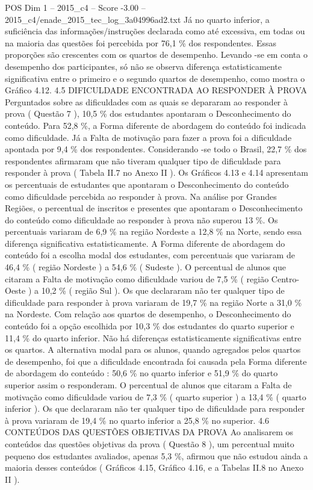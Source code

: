 \begin{textsample}{POS Dim 1 – 2015\_c4 – Score -3.00 – 2015\_c4/enade\_2015\_tec\_log\_3a04996ad2.txt}
Já no quarto inferior, a suficiência das informações/instruções declarada como até excessiva, em todas ou na maioria das questões foi percebida por 76,1 \% dos respondentes.
Essas proporções são crescentes com os quartos de desempenho.
Levando -se em conta o desempenho dos participantes, só não se observa diferença estatisticamente significativa entre o primeiro e o segundo quartos de desempenho, como mostra o Gráfico 4.12. 4.5 DIFICULDADE ENCONTRADA AO RESPONDER À PROVA Perguntados sobre as dificuldades com as quais se depararam ao responder à prova ( Questão 7 ), 10,5 \% dos estudantes apontaram o Desconhecimento do conteúdo.
Para 52,8 \%, a Forma diferente de abordagem do conteúdo foi indicada como dificuldade.
Já a Falta de motivação para fazer a prova foi a dificuldade apontada por 9,4 \% dos respondentes.
Considerando -se todo o Brasil, 22,7 \% dos respondentes afirmaram que não tiveram qualquer tipo de dificuldade para responder à prova ( Tabela II.7 no Anexo II ).
Os Gráficos 4.13 e 4.14 apresentam os percentuais de estudantes que apontaram o Desconhecimento do conteúdo como dificuldade percebida ao responder à prova.
Na análise por Grandes Regiões, o percentual de inscritos e presentes que apontaram o Desconhecimento do conteúdo como dificuldade ao responder à prova não superou 13 \%.
Os percentuais variaram de 6,9 \% na região Nordeste a 12,8 \% na Norte, sendo essa diferença significativa estatisticamente.
A Forma diferente de abordagem do conteúdo foi a escolha modal dos estudantes, com percentuais que variaram de 46,4 \% ( região Nordeste ) a 54,6 \% ( Sudeste ).
O percentual de alunos que citaram a Falta de motivação como dificuldade variou de 7,5 \% ( região Centro-Oeste ) a 10,2 \% ( região Sul ).
Os que declararam não ter qualquer tipo de dificuldade para responder à prova variaram de 19,7 \% na região Norte a 31,0 \% na Nordeste.
Com relação aos quartos de desempenho, o Desconhecimento do conteúdo foi a opção escolhida por 10,3 \% dos estudantes do quarto superior e 11,4 \% do quarto inferior.
Não há diferenças estatisticamente significativas entre os quartos.
A alternativa modal para os alunos, quando agregados pelos quartos de desempenho, foi que a dificuldade encontrada foi causada pela Forma diferente de abordagem do conteúdo : 50,6 \% no quarto inferior e 51,9 \% do quarto superior assim o responderam.
O percentual de alunos que citaram a Falta de motivação como dificuldade variou de 7,3 \% ( quarto superior ) a 13,4 \% ( quarto inferior ).
Os que declararam não ter qualquer tipo de dificuldade para responder à prova variaram de 19,4 \% no quarto inferior a 25,8 \% no superior. 4.6 CONTEÚDOS DAS QUESTÕES OBJETIVAS DA PROVA Ao analisarem os conteúdos das questões objetivas da prova ( Questão 8 ), um percentual muito pequeno dos estudantes avaliados, apenas 5,3 \%, afirmou que não estudou ainda a maioria desses conteúdos ( Gráficos 4.15, Gráfico 4.16, e a Tabelas II.8 no Anexo II ).

\end{textsample}
